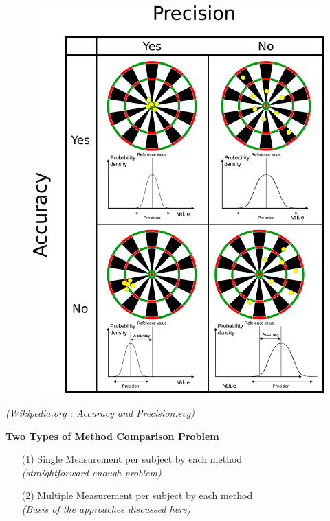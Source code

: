\documentclass[compress]{beamer}        %
\makeatletter
\newcommand{\tcb}{\textcolor{beamer@blendedblue}}
\makeatother
\begin{document}
		\begin{frame}
			\begin{figure}
\centering
\includegraphics[width=0.45\linewidth]{images/AccuracyPrecision}
\end{figure}
\textit{(Wikipedia.org : Accuracy and Precision.svg)}
		\end{frame}
		
	\begin{frame}{\bf \tcb{Two Types of Method Comparison Problem}}
		\Large
		\begin{itemize}
			\item[(1)] Single Measurement per subject by each method\\  \textit{(straightforward enough problem)}\\ \bigskip
			\item[(2)] Multiple Measurement per subject by each method\\ \textit{(Basis of the approaches discussed here)}
		\end{itemize}
	
	\end{frame}
	
\end{document}
